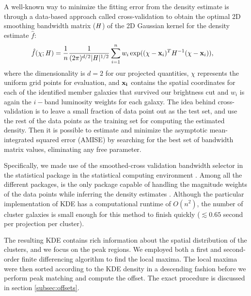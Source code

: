 A well-known way to minimize the fitting error from the density estimate is through
a data-based approach called cross-validation to obtain 
the optimal 2D smoothing
bandwidth matrix ($\mathbf{\it H}$) of the 2D Gaussian kernel for the
density estimate $\hat{f}$:
\begin{align}
	\hat{f}(\chi; \mathbf{\it H}) &= \frac{1}{n} \frac{1}{(2\pi)^{d/2}|\mathbf{\it H}|^{1/2}}
	\sum_{i=1}^n w_i \exp((\chi-{\bf x}_i)^T H^{-1} (\chi-{\bf x}_i)),
	\label{eq:cross_validated_bandwidth}
\end{align}
where the dimensionality is $d=2$ for our projected quantities,
$\chi$ represents the uniform grid points for evaluation, and 
$\bf{x}_i$ contains the spatial coordinates for each of the identified member 
galaxies that survived our brightness cut and $w_i$ is again the $i-$band
luminosity weights for each galaxy.
The idea behind cross-validation is to leave a small fraction of data point 
out as the test set, and use the rest of the data points as 
the training set for computing the estimated density.
Then it is possible to estimate and minimize the asymptotic mean-integrated squared error
(AMISE)  by searching
for the best set of bandwidth matrix values, eliminating any free parameter. 

Specifically, we made use of the smoothed-cross validation \citep{Hall1992} 
bandwidth selector in the statistical package {} \citep{Duong2007} 
in the {} statistical computing environment \citep{R_core}. 
Among all the different {} packages, {} is the
only package capable of handling the magnitude weights of the data points 
while inferring the density estimates \citep{Deng2011}. 
Although the particular implementation of KDE has a computational runtime of $O(n^2)$, 
the number of cluster galaxies is
small enough for this method to finish quickly ($\lesssim 0.65$ second per
projection per cluster). 

The resulting KDE contains rich information about the spatial distribution of
the clusters, and we focus on the peak regions.  
We employed both a first and second-order  
finite differencing algorithm to find the local maxima.  
The local maxima were then sorted according to the KDE density in a descending
fashion before we perform peak matching and compute the offset. The exact
procedure is discussed in section \ref{subsec:offsets}. 

